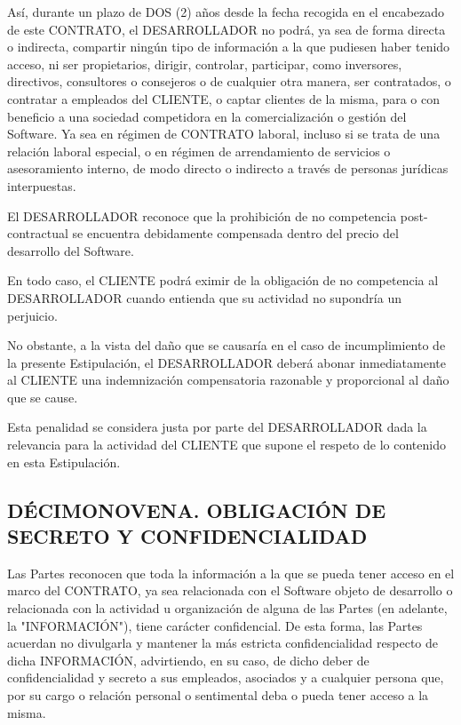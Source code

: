 \documentclass[a4paper,11pt]{report}
\begin{document}
	Así, durante un plazo de DOS (2) años desde la fecha recogida en el
	encabezado de este CONTRATO, el DESARROLLADOR no podrá, ya sea de forma
	directa o indirecta, compartir ningún tipo de información a la que
	pudiesen haber tenido acceso, ni ser propietarios, dirigir, controlar,
	participar, como inversores, directivos, consultores o consejeros o de
	cualquier otra manera, ser contratados, o contratar a empleados del
	CLIENTE, o captar clientes de la misma, para o con beneficio a una
	sociedad competidora en la comercialización o gestión del Software. Ya
	sea en régimen de CONTRATO laboral, incluso si se trata de una relación
	laboral especial, o en régimen de arrendamiento de servicios o
	asesoramiento interno, de modo directo o indirecto a través de personas
	jurídicas interpuestas.

	El DESARROLLADOR reconoce que la prohibición de no competencia
	post-contractual se encuentra debidamente compensada dentro del precio
	del desarrollo del Software.

	En todo caso, el CLIENTE podrá eximir de la obligación de no competencia
	al DESARROLLADOR cuando entienda que su actividad no supondría un
	perjuicio.

	No obstante, a la vista del daño que se causaría en el caso de
	incumplimiento de la presente Estipulación, el DESARROLLADOR deberá
	abonar inmediatamente al CLIENTE una indemnización compensatoria
	razonable y proporcional al daño que se cause.

	Esta penalidad se considera justa por parte del DESARROLLADOR dada la
	relevancia para la actividad del CLIENTE que supone el respeto de lo
	contenido en esta Estipulación.

	\subsection*{DÉCIMONOVENA. OBLIGACIÓN DE SECRETO Y CONFIDENCIALIDAD}

	Las Partes reconocen que toda la información a la que se pueda tener
	acceso en el marco del CONTRATO, ya sea relacionada con el Software
	objeto de desarrollo o relacionada con la actividad u organización de
	alguna de las Partes (en adelante, la "{INFORMACIÓN}"), tiene carácter
	confidencial. De esta forma, las Partes acuerdan no divulgarla y
	mantener la más estricta confidencialidad respecto de dicha INFORMACIÓN,
	advirtiendo, en su caso, de dicho deber de confidencialidad y secreto a
	sus empleados, asociados y a cualquier persona que, por su cargo o
	relación personal o sentimental deba o pueda tener acceso a la misma.
\end{document}
